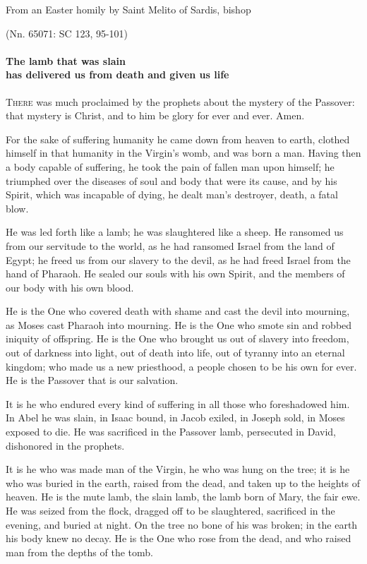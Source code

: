 From an Easter homily by Saint Melito of Sardis, bishop

\par \hfill(Nn. 65071: SC 123, 95-101)

\paragraph{The lamb that was slain\\ has delivered us from death and given us life}

\lettrine[lines=3,loversize=0.15]{T}{here} was much proclaimed by the prophets about the mystery of the Passover: that mystery is Christ, and to him be glory for ever and ever. Amen.

For the sake of suffering humanity he came down from heaven to earth, clothed himself in that humanity in the Virgin’s womb, and was born a man. Having then a body capable of suffering, he took the pain of fallen man upon himself; he triumphed over the diseases of soul and body that were its cause, and by his Spirit, which was incapable of dying, he dealt man’s destroyer, death, a fatal blow.

He was led forth like a lamb; he was slaughtered like a sheep. He ransomed us from our servitude to the world, as he had ransomed Israel from the land of Egypt; he freed us from our slavery to the devil, as he had freed Israel from the hand of Pharaoh. He sealed our souls with his own Spirit, and the members of our body with his own blood.

He is the One who covered death with shame and cast the devil into mourning, as Moses cast Pharaoh into mourning. He is the One who smote sin and robbed iniquity of offspring. He is the One who brought us out of slavery into freedom, out of darkness into light, out of death into life, out of tyranny into an eternal kingdom; who made us a new priesthood, a people chosen to be his own for ever. He is the Passover that is our salvation.

It is he who endured every kind of suffering in all those who foreshadowed him. In Abel he was slain, in Isaac bound, in Jacob exiled, in Joseph sold, in Moses exposed to die. He was sacrificed in the Passover lamb, persecuted in David, dishonored in the prophets.

It is he who was made man of the Virgin, he who was hung on the tree; it is he who was buried in the earth, raised from the dead, and taken up to the heights of heaven. He is the mute lamb, the slain lamb, the lamb born of Mary, the fair ewe. He was seized from the flock, dragged off to be slaughtered, sacrificed in the evening, and buried at night. On the tree no bone of his was broken; in the earth his body knew no decay. He is the One who rose from the dead, and who raised man from the depths of the tomb.

